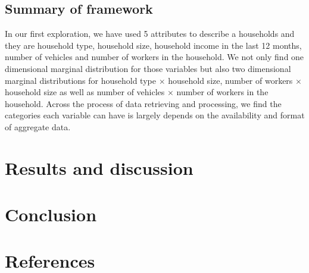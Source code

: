 \documentclass[11pt,twoside]{article}
\numberwithin{equation}{section}
\newcommand{\?}{\stackrel{?}{=}}
\begin{document}
\subsection{Summary of framework}
In our first exploration, we have used 5 attributes to describe a households and they are household type, household size, household income in the last 12 months, number of vehicles and number of workers in the household. We not only find one dimensional marginal distribution for those variables but also two dimensional marginal distributions for household type $\times$ household size, number of workers $\times$ household size as well as number of vehicles $\times$ number of workers in the household. Across the process of data retrieving and processing, we find the categories each variable can have is largely depends on the availability and format of aggregate data.




\section{Results and discussion}



\section{Conclusion}
\section{References}
\printbibliography

\appendix
\end{document}
